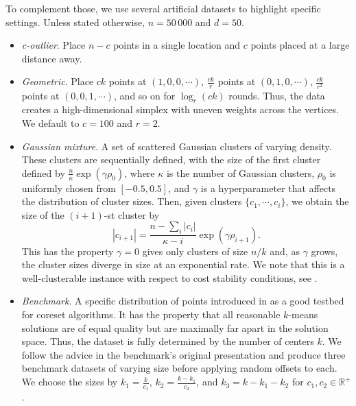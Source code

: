 To complement those, we use several artificial datasets to highlight specific settings. Unless stated otherwise, $n = 50\,000$ and $d=50$.
\begin{itemize}

    \item \emph{c-outlier}. Place $n-c$ points in a single location and $c$ points placed at a large distance away.

    \item \emph{Geometric}. Place $c k$ points at $(1, 0, 0, \cdots)$, $\frac{ck}{r}$ points at $(0, 1, 0, \cdots)$, $\frac{ck}{r^2}$ points
        at $(0, 0, 1, \cdots)$, and so on for $\log_r (ck)$ rounds. Thus, the data creates a high-dimensional simplex with uneven weights across the vertices. We
        default to $c = 100$ and $r=2$.

    \item \emph{Gaussian mixture}. A set of scattered Gaussian clusters of varying density. These clusters are sequentially defined, with the size of the first
        cluster defined by $\frac{n}{\kappa} \exp \left( \gamma \rho_0 \right)$, where $\kappa$ is the number of Gaussian clusters, $\rho_0$ is
        uniformly chosen from $[-0.5, 0.5]$, and $\gamma$ is a hyperparameter that affects the distribution of cluster sizes. 
        Then, given clusters $\{c_1, \cdots, c_i\}$, we obtain the size of the $(i+1)$-st cluster by 
        \[|c_{i+1}| = \frac{n - \sum_i |c_i|}{\kappa - i}\exp \left( \gamma \rho_{i+1} \right).\]
        This has the property $\gamma = 0$ gives only clusters of size $n / k$ and, as $\gamma$ grows, the cluster sizes diverge in size at an exponential rate.
        We note that this is a well-clusterable instance with respect to cost stability conditions, see \cite{AwS12,Cohen-AddadS17,KuK10,ORSS12}.

    \item \emph{Benchmark}. A specific distribution of points introduced in \cite{chrisESA} as a good testbed for coreset algorithms.  It has the property that
        all reasonable $k$-means solutions are of equal quality but are maximally far apart in the solution space. Thus, the dataset is fully determined by the
        number of centers $k$. We follow the advice in the benchmark's original presentation and produce three benchmark datasets of varying size before
        applying random offsets to each. We choose the sizes by $k_1 = \frac{k}{c_1}$, $k_2 = \frac{k - k_1}{c_2}$, and $k_3 = k - k_1 - k_2$ for $c_1, c_2 \in
        \mathbb{R}^+$.

\end{itemize}

